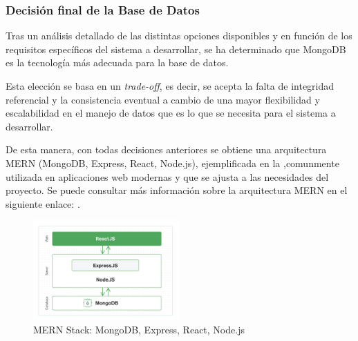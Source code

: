 \subsubsection{Decisión final de la Base de Datos}
Tras un análisis detallado de las distintas opciones disponibles y en función de los requisitos específicos del sistema a desarrollar, se ha determinado que MongoDB es la tecnología más adecuada para la base de datos. 

Esta elección se basa en un \textit{trade-off}, es decir, se acepta la falta de integridad referencial y la consistencia eventual a cambio de una mayor flexibilidad y escalabilidad en el manejo de datos que es lo que se necesita para el sistema a desarrollar.

De esta manera, con todas decisiones anteriores se obtiene una arquitectura MERN (MongoDB, Express, React, Node.js), ejemplificada en la ,comunmente utilizada en aplicaciones web modernas y que se ajusta a las necesidades del proyecto. 
Se puede consultar más información sobre la arquitectura MERN en el siguiente enlace: .
\begin{figure}[H]
    \centering
    \includegraphics[width=0.5\textwidth]{figures/4-Estudio-viabilidad/4_MERN.png}
    \caption{MERN Stack: MongoDB, Express, React, Node.js}
    \label{fig:arquitectura_mern}
    \hypertarget{fig:arquitectura_mern}{}
\end{figure}
